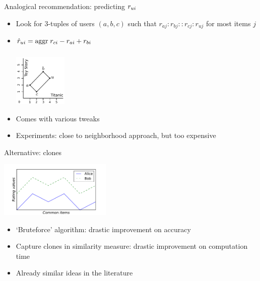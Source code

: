 \documentclass{beamer}
\begin{document}
\begin{frame}{Analogical recommendation: predicting $r_{ui}$}
  \begin{itemize}
    \item Look for $3$-tuples of users $(a, b, c)$ such that $r_{aj}: r_{bj} ::
      r_{cj} : r_{uj}$ for most items $j$
    \item $\hat{r}_{ui} = \underset{}{\operatorname{aggr}}\; r_{ci} - r_{ai} + r_{bi}$
    \begin{center}
      \includegraphics[width=0.2\textwidth]{figures/analogical_recommendation.pdf}
    \end{center}
  \item Comes with various tweaks
  \item Experiments: close to neighborhood approach, but too expensive
  \end{itemize}
\end{frame}

\begin{frame}{Alternative: clones}
    \begin{center}
      \includegraphics[width=0.4\textwidth]{figures/clones.pdf}
    \end{center}
    \begin{itemize}
      \item `Bruteforce' algorithm: drastic improvement on accuracy
      \item Capture clones in similarity measure: drastic improvement on
        computation time
      \item Already similar ideas in the literature
    \end{itemize}
\end{frame}
\end{document}
